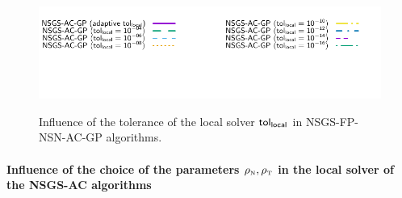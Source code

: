 \begin{figure}
   \\
{\includegraphics[width=\legendwidth]{figure/NSGS/LocalTol/1.0e-08/50/time/profile-Chain_legend.pdf}} 
\caption{Influence of the tolerance of the local solver $\sf tol_{local}$ in {\sf NSGS-FP-NSN-AC-GP} algorithms.}
\label{fig:NSGS/LocalTol}
\end{figure}

\paragraph{Influence of the choice of the parameters $\rho_{\hbox{\tiny{N}}}, \rho_{\hbox{\tiny{T}}}$ in the local solver of the {\sf NSGS-AC} algorithms}

